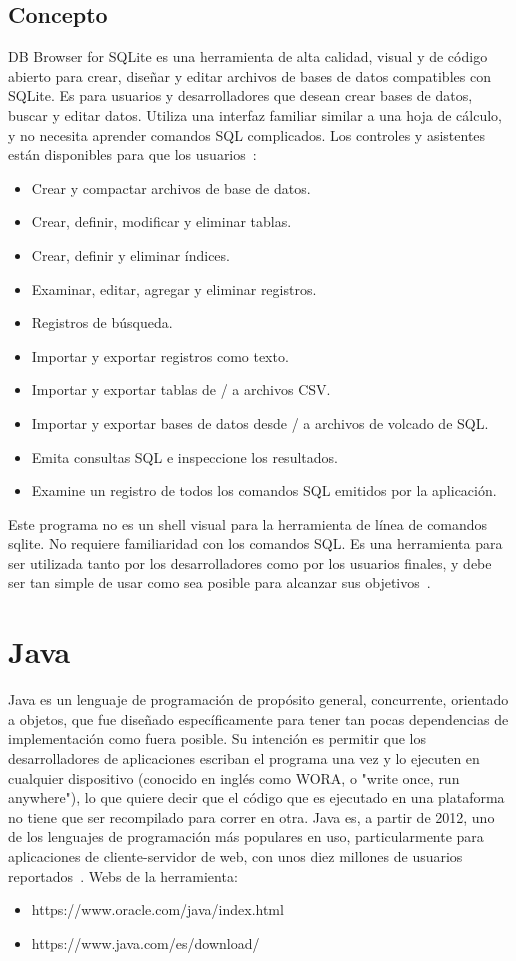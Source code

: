 \subsection{Concepto}
DB Browser for SQLite es una herramienta de alta calidad, visual y de código abierto para crear, diseñar y editar archivos de bases de datos compatibles con SQLite. Es para usuarios y desarrolladores que desean crear bases de datos, buscar y editar datos. Utiliza una interfaz familiar similar a una hoja de cálculo, y no necesita aprender comandos SQL complicados. Los controles y asistentes están disponibles para que los usuarios~\cite{sqlitebrowser}:
\begin{itemize}
	\item Crear y compactar archivos de base de datos.
	\item Crear, definir, modificar y eliminar tablas.
	\item Crear, definir y eliminar índices.
	\item Examinar, editar, agregar y eliminar registros.
	\item Registros de búsqueda.
	\item Importar y exportar registros como texto.
	\item Importar y exportar tablas de / a archivos CSV.
	\item Importar y exportar bases de datos desde / a archivos de volcado de SQL.
	\item Emita consultas SQL e inspeccione los resultados.
	\item Examine un registro de todos los comandos SQL emitidos por la aplicación.

\end{itemize}
Este programa no es un shell visual para la herramienta de línea de comandos sqlite. No requiere familiaridad con los comandos SQL. Es una herramienta para ser utilizada tanto por los desarrolladores como por los usuarios finales, y debe ser tan simple de usar como sea posible para alcanzar sus objetivos~\cite{sqlitebrowser}.
\section{Java}
Java es un lenguaje de programación de propósito general, concurrente, orientado a objetos, que fue diseñado específicamente para tener tan pocas dependencias de implementación como fuera posible. Su intención es permitir que los desarrolladores de aplicaciones escriban el programa una vez y lo ejecuten en cualquier dispositivo (conocido en inglés como WORA, o "write once, run anywhere"), lo que quiere decir que el código que es ejecutado en una plataforma no tiene que ser recompilado para correr en otra. Java es, a partir de 2012, uno de los lenguajes de programación más populares en uso, particularmente para aplicaciones de cliente-servidor de web, con unos diez millones de usuarios reportados~\cite{wiki:java}. 
Webs de la herramienta:
\begin{itemize}
	\item https://www.oracle.com/java/index.html
	\item https://www.java.com/es/download/
\end{itemize}
